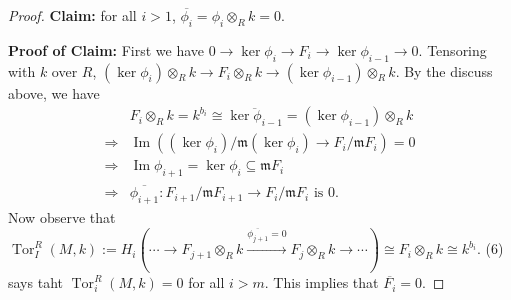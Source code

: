 \documentclass[cs4size]{article}
\newcommand{\su}{\subseteq}
\newcommand{\frm}{\mathfrak{m}}
\newcommand{\ra}{\rightarrow}
\newcommand{\xr}{\xrightarrow}
\newcommand{\Ra}{\Rightarrow}
\DeclareMathOperator{\Tor}{Tor}
\DeclareMathOperator{\Image}{Im}
\begin{document}
\begin{proof}
\textbf{Claim:} for all $i>1$, $\overline{\phi_i}=\phi_i\otimes_Rk=0$.

\textbf{Proof of Claim:} First we have $0\ra \ker \phi_i\ra F_i\ra \ker\phi_{i-1}\ra 0$. Tensoring with $k$ over $R$, $(\ker \phi_i)\otimes_R k\ra F_i\otimes_Rk\ra (\ker \phi_{i-1})\otimes_Rk$. By the discuss above, we have
\begin{align*}
&F_i\otimes_Rk=k^{b_i}\cong \overline{\ker \phi_{i-1}}=(\ker \phi_{i-1})\otimes_Rk\\
\Ra& \Image ((\ker\phi_i)/\frm(\ker\phi_i)\ra F_i/\frm F_i)=0\\
\Ra& \Image \phi_{i+1}=\ker \phi_i\su\frm F_i\\
\Ra& \overline{\phi_{i+1}}: F_{i+1}/\frm F_{i+1}\ra F_i/\frm F_i\text{ is }0.
\end{align*}
Now observe that $\Tor_I^R(M,k):=H_i(\cdots\ra F_{j+1}\otimes_Rk\xr{\overline{\phi_{j+1}}=0}F_j\otimes_Rk\ra\cdots)\cong F_i\otimes_R k\cong k^{b_i}$. (6) says taht $\Tor_i^R(M,k)=0$ for all $i>m$. This implies that $\overline{F_i}=0$.
\end{proof}
\end{document}
